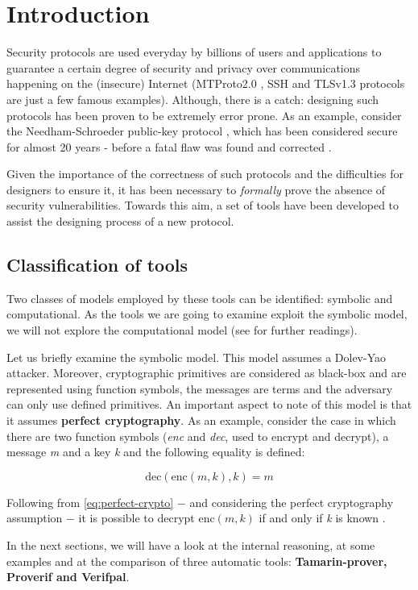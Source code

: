 
\section{Introduction}
\label{section:introduction}

Security protocols are used everyday by billions of users and applications to guarantee a certain degree of security and privacy over communications happening on the (insecure) Internet (MTProto2.0 \cite{Telegram-MTProto2.0}, SSH \cite{rfc4251} and TLSv1.3 \cite{TLSv1.3_specs} protocols are just a few famous examples). Although, there is a catch: designing such protocols has been proven to be extremely error prone. As an example, consider the Needham-Schroeder public-key protocol \cite{NSPK}, which has been considered secure for almost 20 years - before a fatal flaw was found and corrected \cite{NSPK_LoweGavin}.

Given the importance of the correctness of such protocols and the difficulties for designers to ensure it, it has been necessary to \textit{formally} prove the absence of security vulnerabilities. Towards this aim, a set of tools have been developed to assist the designing process of a new protocol.

\subsection{Classification of tools}

Two classes of models employed by these tools can be identified: symbolic and computational. As the tools we are going to examine exploit the symbolic model, we will not explore the computational model (see \cite{ReconcilingComputationalSymbolic, SymbolicComputationalBlanchet, 10.1007/978-3-540-31987-0_12} for further readings). 

Let us briefly examine the symbolic model. This model assumes a Dolev-Yao \cite{Dolev-Yao} attacker. Moreover, cryptographic primitives are considered as black-box and are represented using function symbols, the messages are terms and the adversary can only use defined primitives. An important aspect to note of this model is that it assumes \textbf{perfect cryptography}. As an example, consider the case in which there are two function symbols (\textit{enc} and \textit{dec}, used to encrypt and decrypt), a message \textit{m} and a key \textit{k} and the following equality is defined:

\begin{equation}
\label{eq:perfect-crypto}
    \mbox{dec}\left(\mbox{enc}\left(m, k\right), k\right) = m
\end{equation}

Following from \cref{eq:perfect-crypto} $-$ and considering the perfect cryptography assumption $-$ it is possible to decrypt $\mbox{enc}\left(m, k\right)$ if and only if \textit{k} is known \cite{SymbolicComputationalBlanchet}.

In the next sections, we will have a look at the internal reasoning, at some examples and at the comparison of three automatic tools: \textbf{Tamarin-prover, Proverif and Verifpal}.